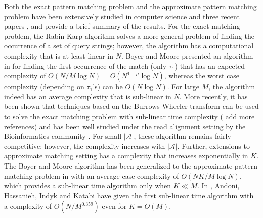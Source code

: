 Both the exact pattern matching problem and the approximate pattern matching problem have been extensively studied in computer science and three recent papers \cite{andoni2013shift}, \cite{amir2004faster} and \cite{navarro2001guided} provide a brief summary of the results. For the exact matching problem, the Rabin-Karp algorithm solves a more general problem of finding the occurrence of a set of query strings; however, the algorithm has a computational complexity that is at least linear in $N$. Boyer and Moore presented an algorithm in \cite{boyer1977fast} for finding the first occurrence of the match (only $\tau_1$) that has an expected complexity of $O(N/M \log N) = O(N^{1-\mu} \log N)$, whereas the worst case complexity (depending on $\tau_1$'s) can be $O(N \log N)$. For large $M$, the algorithm indeed has an average complexity that is sub-linear in $N$. More recently, it has been shown that techniques based on the Burrows-Wheeler transform can be used to solve the exact matching problem with sub-linear time complexity \cite{ferragina2005indexing} ({\color{blue} add more references}) and has been well studied under the read alignment setting by the Bioinformatics community \cite{li2009fast,li2010fast}. For small $|\mathcal{A}|$, these algorithm remains fairly competitive; however, the complexity increases with $|\mathcal{A}|$. Further, extensions to approximate matching setting \cite{zhang2003approximate} has a complexity that increases exponentially in $K$. The Boyer and Moore algorithm has been generalized to the approximate pattern matching problem in \cite{chang1994approximate} with an average case complexity of $O(NK/M \log N)$, which provides a sub-linear time algorithm only when $K \ll M$. In \cite{andoni2013shift}, Andoni, Hassanieh, Indyk and Katabi have given the first sub-linear time algorithm with a complexity of $O(N/M^{0.359})$ even for $K = O(M)$.


